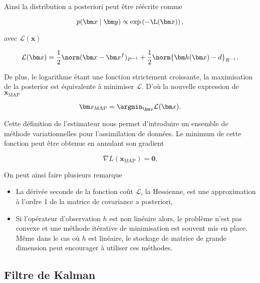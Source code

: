 Ainsi la distribution a posteriori peut être réécrite comme

\begin{equation*}
    p(\bm x \mid \bm y) \propto \exp\left(- \mathcal{\L}(\bm x)\right),
\end{equation*}

avec $\mathcal L(\bm x)$

\begin{equation*}
    \mathcal L(\bm x) = \frac12 \norm(\bm x - \bm x^f)_{P^{-1}} + \frac12 \norm{\bm h(\bm x) - d}_{R^{-1}}.
\end{equation*}

De plus, le logarithme étant une fonction strictement croissante, la maximisation de la posterior est équivalente à minimiser $\mathcal L$. D'où la nouvelle expression de $\bm x_{\text{MAP}}$

\begin{equation*}
    \bm x_{\text{MAP}} = \argmin_{\bm x} \mathcal L(\bm x).
\end{equation*}

Cette définition de l'estimateur nous permet d'introduire un ensemble de méthode variationnelles pour l'assimilation de données.
Le minimum de cette fonction peut être obtenue en annulant son gradient

\begin{equation*}
    \nabla  L(\bm x_{\text{MAP}}) = \bm 0.
\end{equation*}

On peut ainsi faire plusieurs remarque

\begin{itemize}
    \item La dérivée seconde de la fonction coût $\mathcal L$, la Hessienne, est une approximation à l'ordre 1 de la matrice de covariance a posteriori,
    \item Si l'opérateur d'observation $h$ est non linéaire alors, le problème n'est pas convexe et une méthode itérative de minimisation est souvent mis en place. Même dans le cas où $h$ est linéaire, le stockage de matrice de grande dimension peut encourager à utiliser ces méthodes.
\end{itemize}




\subsection{Filtre de Kalman}

